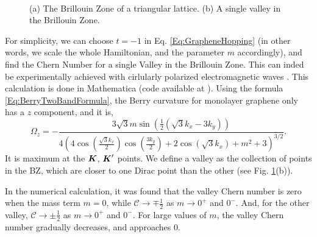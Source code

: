 \documentclass{report}
\renewcommand\vec[1]{\ensuremath\boldsymbol{#1}} %
\begin{document}
\begin{figure}[h!]
	\centering
	\caption{(a) The Brillouin Zone of a triangular lattice. (b) A single valley in the Brillouin Zone.
	}~\label{Fig:BZ}
\end{figure}
For simplicity, we can choose $t = -1$ in Eq. \eqref{Eq:GrapheneHopping} (in other words, we scale the whole Hamiltonian, and the parameter $m$ accordingly), and find the Chern Number for a single Valley in the Brillouin Zone. This can inded be experimentally achieved with cirlularly polarized electromagnetic waves \cite{valleyPolBilayerGraphene}. This calculation is done in Mathematica (code available at \cite{code:mathematicaCode}). 
Using the formula \eqref{Eq:BerryTwoBandFormula}, the Berry curvature for monolayer graphene only has a $z$ component, and it is,
$$\Omega_z = -\frac{3 \sqrt{3} m \sin \left(\frac{1}{2}(\sqrt{3} k_x -3 k_y)\right)}{4\left(4 \cos \left(\frac{\sqrt{3} k_x}{2}\right) \cos \left(\frac{3 k_y}{2}\right)+2 \cos (\sqrt{3} k_x)+m^{2}+3\right)^{3 / 2}}.$$
It is maximum at the $\vec{K}$, $\vec{K}'$ points.
We define a valley as the collection of points in the BZ, which are closer to one Dirac point than the other (see Fig. \ref{Fig:BZ}(b)).

In the numerical calculation, it was found that the valley Chern number is zero when the mass term $m = 0$, while $\mathcal{C} \rightarrow \mp \frac{1}{2}$ as $m \rightarrow 0^+$ and $0^-$. And, for the other valley, $\mathcal{C} \rightarrow \pm \frac{1}{2}$ as $m \rightarrow 0^+$ and $0^-$. For large values of $m$, the valley Chern number gradually decreases, and approaches $0$.
\end{document}
